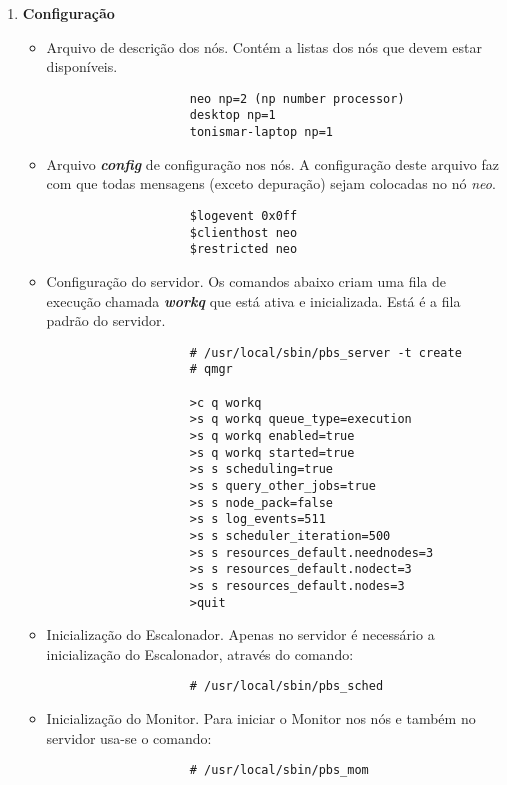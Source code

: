 \begin{enumerate}
	\item \textbf{Configuração}
		\begin{itemize}
			\item Arquivo de descrição dos nós. Contém a listas dos nós que devem estar disponíveis.
				\begin{scriptsize}
				\begin{verbatim}
					neo np=2 (np number processor)
					desktop np=1
					tonismar-laptop np=1
				\end{verbatim}
				\end{scriptsize}
			\item Arquivo \textbf{\emph{config}} de configuração nos nós. A configuração deste arquivo faz com que todas mensagens (exceto depuração) sejam colocadas no nó \emph{neo}.
				\begin{scriptsize}
				\begin{verbatim}
					$logevent 0x0ff
					$clienthost neo
					$restricted neo
				\end{verbatim}
				\end{scriptsize}
			\item Configuração do servidor. Os comandos abaixo criam uma fila de execução chamada \emph{\textbf{workq}} que está ativa e inicializada. Está é a fila padrão do servidor.
				\begin{scriptsize}
				\begin{verbatim}
					# /usr/local/sbin/pbs_server -t create
					# qmgr
					
					>c q workq
					>s q workq queue_type=execution
					>s q workq enabled=true
					>s q workq started=true
					>s s scheduling=true
					>s s query_other_jobs=true
					>s s node_pack=false
					>s s log_events=511
					>s s scheduler_iteration=500
					>s s resources_default.neednodes=3
					>s s resources_default.nodect=3
					>s s resources_default.nodes=3
					>quit
				\end{verbatim}
				\end{scriptsize}
			\item Inicialização do Escalonador. Apenas no servidor é necessário a inicialização do Escalonador, através do comando:
				\begin{scriptsize}
				\begin{verbatim}
					# /usr/local/sbin/pbs_sched
				\end{verbatim}
				\end{scriptsize}
			\item Inicialização do Monitor. Para iniciar o Monitor nos nós e também no servidor usa-se o comando:
				\begin{scriptsize}
				\begin{verbatim}
					# /usr/local/sbin/pbs_mom
				\end{verbatim}
				\end{scriptsize}
		\end{itemize}
		

\end{enumerate}
